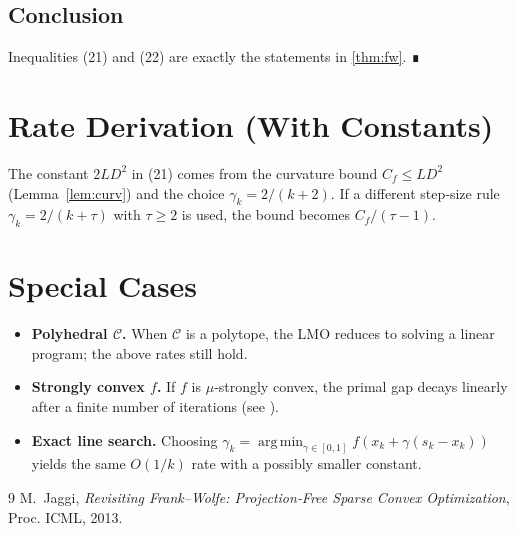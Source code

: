 \documentclass{article}
\newcommand{\argmin}{\operatorname*{arg\,min}}
\begin{document}
\subsection*{Conclusion}
Inequalities (21) and (22) are exactly the statements in \eqref{thm:fw}. ∎

\section*{Rate Derivation (With Constants)}
The constant $2L D^{2}$ in (21) comes from the curvature bound $C_{f}\le L D^{2}$ (Lemma~\ref{lem:curv}) and the choice $\gamma_{k}=2/(k+2)$. If a different step‑size rule $\gamma_{k}=2/(k+\tau)$ with $\tau\ge2$ is used, the bound becomes $C_{f}/(\tau-1)$.

\section*{Special Cases}
\begin{itemize}
\item \textbf{Polyhedral $\mathcal{C}$.} When $\mathcal{C}$ is a polytope, the LMO reduces to solving a linear program; the above rates still hold.
\item \textbf{Strongly convex $f$.} If $f$ is $\mu$‑strongly convex, the primal gap decays linearly after a finite number of iterations (see \cite{Jaggi2013}).
\item \textbf{Exact line search.} Choosing $\gamma_{k}=\argmin_{\gamma\in[0,1]}f(x_{k}+\gamma(s_{k}-x_{k}))$ yields the same $O(1/k)$ rate with a possibly smaller constant.
\end{itemize}

\begin{thebibliography}{9}
M.~Jaggi, \emph{Revisiting Frank–Wolfe: Projection‑Free Sparse Convex Optimization}, Proc. ICML, 2013.
\end{thebibliography}
\end{document}
